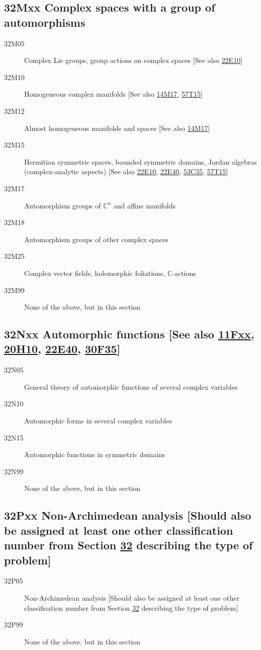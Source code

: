 \documentclass[letterpaper]{article}
\begin{document}
\subsection*{32Mxx  Complex spaces with a group of automorphisms }\label{32Mxx}
\begin{description}  
\item [32M05]\label{32M05} Complex Lie groups, group actions on complex spaces [See also \hyperref[22E10]{22E10}]
\item [32M10]\label{32M10} Homogeneous complex manifolds [See also \hyperref[14M17]{14M17}, \hyperref[57T15]{57T15}]
\item [32M12]\label{32M12} Almost homogeneous manifolds and spaces [See also \hyperref[14M17]{14M17}]
\item [32M15]\label{32M15} Hermitian symmetric spaces, bounded symmetric domains, Jordan algebras (complex-analytic aspects) [See also \hyperref[22E10]{22E10}, \hyperref[22E40]{22E40}, \hyperref[53C35]{53C35}, \hyperref[57T15]{57T15}]
\item [32M17]\label{32M17} Automorphism groups of $\mathbb{C}^n$ and affine manifolds
\item [32M18]\label{32M18} Automorphism groups of other complex spaces
\item [32M25]\label{32M25} Complex vector fields, holomorphic foliations, $\mathbb{C}$-actions
\item [32M99]\label{32M99} None of the above, but in this section
\end{description}
\subsection*{32Nxx  Automorphic functions [See also \hyperref[11Fxx]{11Fxx}, \hyperref[20H10]{20H10}, \hyperref[22E40]{22E40}, \hyperref[30F35]{30F35}] }\label{32Nxx}
\begin{description}  
\item [32N05]\label{32N05} General theory of automorphic functions of several complex variables
\item [32N10]\label{32N10} Automorphic forms in several complex variables
\item [32N15]\label{32N15} Automorphic functions in symmetric domains
\item [32N99]\label{32N99} None of the above, but in this section
\end{description}
\subsection*{32Pxx  Non-Archimedean analysis [Should also be assigned at least one other classification number from Section \hyperref[32-XX]{32} describing the type of problem] }\label{32Pxx}
\begin{description}  
\item [32P05]\label{32P05} Non-Archimedean analysis [Should also be assigned at least one other classification number from Section \hyperref[32-XX]{32} describing the type of problem]
\item [32P99]\label{32P99} None of the above, but in this section
\end{description}
\end{document}
